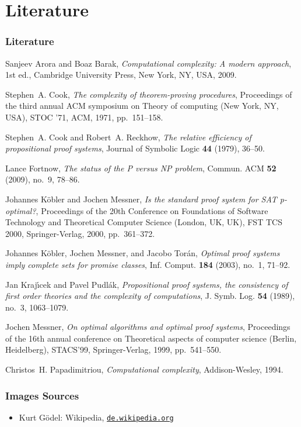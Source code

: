 \section{Literature}

\begin{frame}[allowframebreaks]
  \frametitle{Literature}    
  \begin{thebibliography}{KMT03}

    Sanjeev Arora and Boaz Barak, \emph{Computational complexity: A modern
      approach}, 1st ed., Cambridge University Press, New York, NY, USA, 2009.

    Stephen~A. Cook, \emph{The complexity of theorem-proving procedures},
      Proceedings of the third annual ACM symposium on Theory of computing (New
      York, NY, USA), STOC '71, ACM, 1971, pp.~151--158.

    Stephen~A. Cook and Robert~A. Reckhow, \emph{The relative efficiency of
      propositional proof systems}, Journal of Symbolic Logic \textbf{44} (1979),
      36--50.

    Lance Fortnow, \emph{The status of the {P} versus {NP} problem}, Commun. ACM
      \textbf{52} (2009), no.~9, 78--86.

    Johannes K\"{o}bler and Jochen Messner, \emph{Is the standard proof system for
      {SAT} p-optimal?}, Proceedings of the 20th Conference on Foundations of
      Software Technology and Theoretical Computer Science (London, UK, UK), FST
      TCS 2000, Springer-Verlag, 2000, pp.~361--372.

    Johannes K\"{o}bler, Jochen Messner, and Jacobo Tor\'{a}n, \emph{Optimal proof
      systems imply complete sets for promise classes}, Inf. Comput. \textbf{184}
      (2003), no.~1, 71--92.

    Jan Kraj\'{\i}cek and Pavel Pudl{\'a}k, \emph{Propositional proof systems, the
      consistency of first order theories and the complexity of computations}, J.
      Symb. Log. \textbf{54} (1989), no.~3, 1063--1079.

    Jochen Messner, \emph{On optimal algorithms and optimal proof systems},
      Proceedings of the 16th annual conference on Theoretical aspects of computer
      science (Berlin, Heidelberg), STACS'99, Springer-Verlag, 1999, pp.~541--550.

    Christos~H. Papadimitriou, \emph{Computational complexity}, Addison-Wesley,
      1994.

  \end{thebibliography}

\end{frame}

\begin{frame}[allowframebreaks]
  \frametitle{Images Sources}

  \begin{itemize}
   \item Kurt Gödel: Wikipedia, \texttt{\href{https://de.wikipedia.org/w/index.php?title=Datei:Kurt_g\%C3\%B6del.jpg\&filetimestamp=20110724092213}{de.wikipedia.org}}
  \end{itemize}  
\end{frame}
